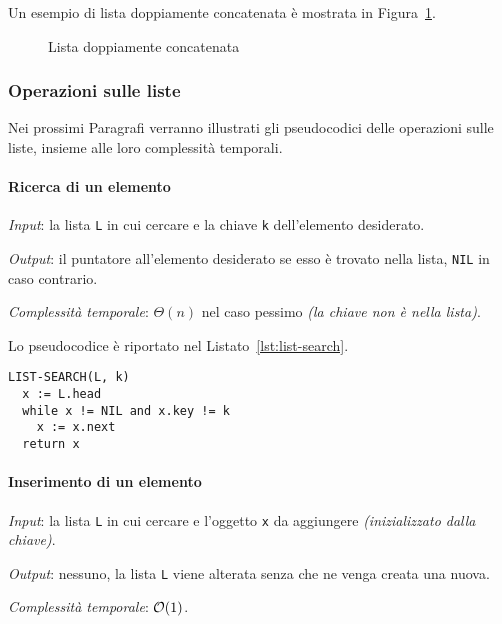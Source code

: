 \documentclass[italian, 10pt]{article}
\begin{document}
\bigskip
Un esempio di lista doppiamente concatenata è mostrata in Figura~\ref{fig:lista-doppiamente-concatenata}.

\begin{figure}[htbp]
  \bigskip
  \centering
  \caption{Lista doppiamente concatenata}
  \label{fig:lista-doppiamente-concatenata}
  \bigskip
\end{figure}

\subsubsection{Operazioni sulle liste}

Nei prossimi Paragrafi verranno illustrati gli pseudocodici delle operazioni sulle liste, insieme alle loro complessità temporali.

\paragraph{Ricerca di un elemento}

\textit{Input}: la lista \texttt{L} in cui cercare e la chiave \texttt{k} dell'elemento desiderato.

\textit{Output}: il puntatore all'elemento desiderato se esso è trovato nella lista, \texttt{NIL} in caso contrario.

\textit{Complessità temporale}: \(\Theta(n)\) nel caso pessimo \textit{(la chiave non è nella lista)}.

\bigskip
Lo pseudocodice è riportato nel Listato~\ref{lst:list-search}.

\begin{lstlisting}[style=pseudocode, caption={Pseudocodice dell'algoritmo \texttt{LIST-SEARCH}}, label={lst:list-search}]
LIST-SEARCH(L, k)
  x := L.head
  while x != NIL and x.key != k
    x := x.next
  return x
\end{lstlisting}

\paragraph{Inserimento di un elemento}

\textit{Input}: la lista \texttt{L} in cui cercare e l'oggetto \texttt{x} da aggiungere \textit{(inizializzato dalla chiave)}.

\textit{Output}: nessuno, la lista \texttt{L} viene alterata senza che ne venga creata una nuova.

\textit{Complessità temporale}: \(\mathcal{O}(1)\).
\end{document}
